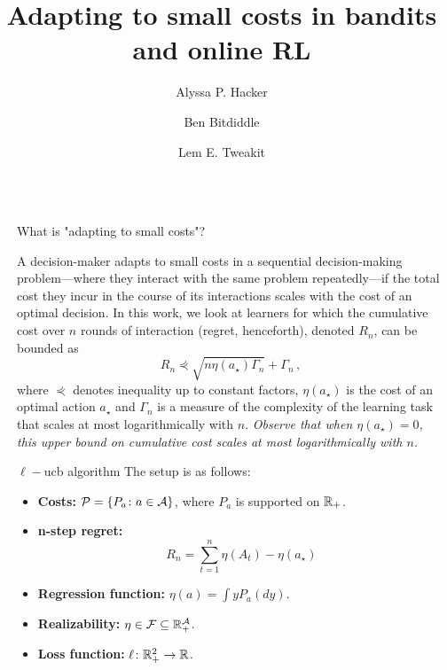 \documentclass[final,notheorems,noamsthm,20pt]{beamer}
\title{Adapting to small costs in bandits and online RL}
\author{Alyssa P. Hacker \inst{1} \and Ben Bitdiddle \inst{2} \and Lem E. Tweakit \inst{2}}
\institute[shortinst]{\inst{1} University of Alberta \samelineand \inst{2} Another Institute}
\newlength{\sepwidth}
\newlength{\colwidth}
\newcommand{\separatorcolumn}{\begin{column}{\sepwidth}\end{column}}
\begin{document}
\begin{frame}[t]
\begin{columns}[t]
\separatorcolumn

\begin{column}{\colwidth}

  \begin{block}{What is "adapting to small costs"?}

    A decision-maker adapts to small costs in a sequential decision-making
    problem---where they interact with the same problem repeatedly---if the
    total cost they incur in the course of its interactions scales with the cost of an optimal decision.
    In this work, we look at learners for which the cumulative cost over $n$ rounds of interaction
    (regret, henceforth), denoted $R_n$, can be bounded as
    $$
    R_n \curlyeqprec \sqrt{n \eta(a_\star) \Gamma_n} + \Gamma_n\,, 
    $$
    where $\curlyeqprec$ denotes inequality up to constant factors, $\eta(a_\star)$ is the cost of an optimal action
    $a_\star$ and $\Gamma_n$ is a measure of the complexity of the learning task that scales at most logarithmically with $n$.
    \emph{Observe that when $\eta(a_\star) = 0$, this upper bound on cumulative cost scales at most logarithmically with $n$.}
  \end{block}

  \begin{block}{$\ell-$ucb algorithm}
    The setup is as follows:
    \begin{itemize}
      \item \textbf{Costs:} $\mathcal{P} = \{P_a \colon a \in \mathcal{A} \}$, where $P_a$ is supported on $\mathbb{R}_+$.
      \item \textbf{n-step regret:}
        \[
            R_n = \sum_{t=1}^n \eta(A_t) - \eta(a_\star)
        \]
      \item \textbf{Regression function:} $\eta(a) = \int y P_a(dy)$.
      \item \textbf{Realizability:} $\eta \in \mathcal{F} \subseteq \mathbb{R}_+^{\mathcal{A}}$.
      \item \textbf{Loss function:} $\ell \colon \mathbb{R}_+^2 \to \mathbb{R}$.
    \end{itemize}


\end{block}
\end{column}
\end{columns}
\end{frame}
\end{document}
